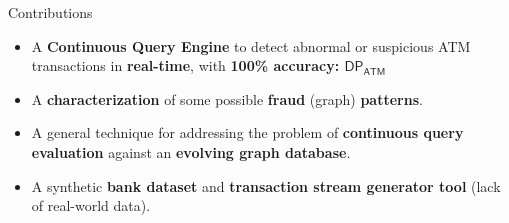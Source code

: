 \begin{frame}{Contributions}
\begin{itemize}
\item A \textbf{Continuous Query Engine} to detect abnormal or suspicious ATM transactions in \textbf{real-time}, with \textbf{100\% accuracy: $\mathsf{DP_{ATM}}$}
\vspace{1em}
\pause
\item A \textbf{characterization} of some possible \textbf{fraud} (graph) \textbf{patterns}.
\vspace{1em}
\pause
\item A general technique for addressing the problem of \textbf{continuous 
query evaluation} against an \textbf{evolving graph database}.
\vspace{1em}
\pause
\item A synthetic \textbf{bank dataset} and \textbf{transaction stream generator tool} (lack of real-world data). %
\end{itemize}
\end{frame}

